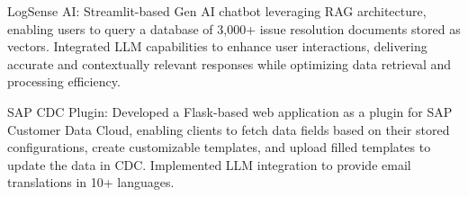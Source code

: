 
   {\projectentry
    {LogSense AI:} {Streamlit-based Gen AI chatbot leveraging RAG architecture, enabling users to query a database of 3,000+ issue resolution documents stored as vectors. Integrated LLM capabilities to enhance user interactions, delivering accurate and contextually relevant responses while optimizing data retrieval and processing efficiency.} 
    }

    {\projectentry
    {SAP CDC Plugin:} {Developed a Flask-based web application as a plugin for SAP Customer Data Cloud, enabling clients to fetch data fields based on their stored configurations, create customizable templates, and upload filled templates to update the data in CDC. Implemented LLM integration to provide email translations in 10+ languages.} 
    }
    